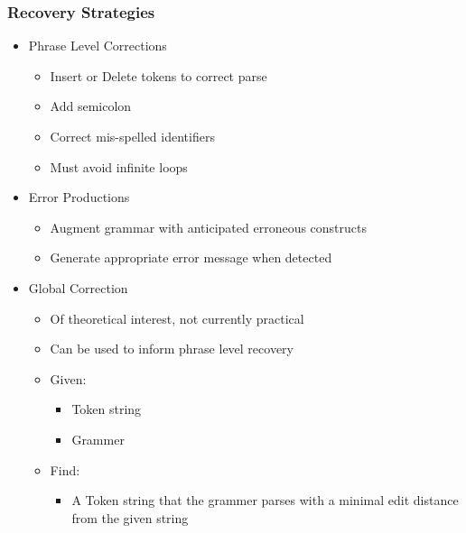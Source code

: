 \documentclass[usepdftitle=false,professionalfonts,compress ]{beamer}
\begin{document}
{
\begin{frame}\frametitle{Recovery Strategies}

	\begin{itemize}
	\item Phrase Level Corrections

	\begin{itemize}
	\item Insert or Delete tokens to correct parse
			\item Add semicolon
			\item Correct mis-spelled identifiers
			\item Must avoid infinite loops
				\end{itemize}

			\item Error Productions

	\begin{itemize}
	\item Augment grammar with anticipated erroneous constructs
			\item Generate appropriate error message when detected
				\end{itemize}

			\item Global Correction

	\begin{itemize}
	\item Of theoretical interest, not currently practical
			\item Can be used to inform phrase level recovery
			\item Given:

	\begin{itemize}
	\item Token string
			\item Grammer
				\end{itemize}

			\item Find:

	\begin{itemize}
	\item A Token string that the grammer parses with a minimal edit distance from the given string
				\end{itemize}

				\end{itemize}

				\end{itemize}

\end{frame}}
\end{document}
